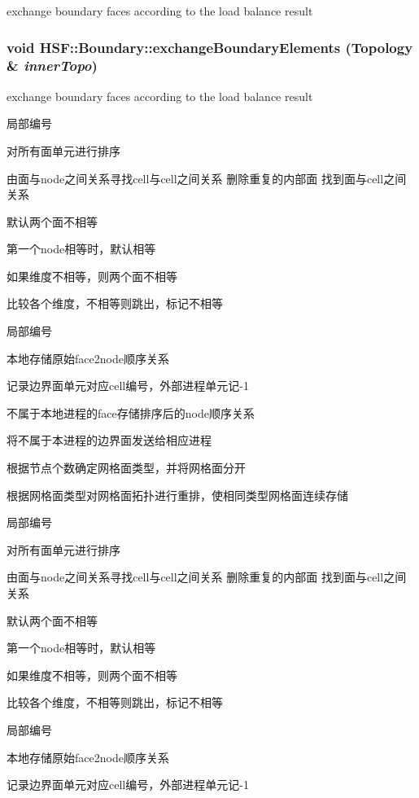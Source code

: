 exchange boundary faces according to the load balance result \hypertarget{classHSF_1_1Boundary_a247677270031ff60c915e7afb1a1de51}{
\subsubsection[{exchangeBoundaryElements}]{\setlength{\rightskip}{0pt plus 5cm}void HSF::Boundary::exchangeBoundaryElements ({\bf Topology} \& {\em innerTopo})}}
\label{classHSF_1_1Boundary_a247677270031ff60c915e7afb1a1de51}


exchange boundary faces according to the load balance result 

局部编号

对所有面单元进行排序

由面与node之间关系寻找cell与cell之间关系 删除重复的内部面 找到面与cell之间关系

默认两个面不相等

第一个node相等时，默认相等

如果维度不相等，则两个面不相等

比较各个维度，不相等则跳出，标记不相等

局部编号

本地存储原始face2node顺序关系

记录边界面单元对应cell编号，外部进程单元记-\/1

不属于本地进程的face存储排序后的node顺序关系

将不属于本进程的边界面发送给相应进程

根据节点个数确定网格面类型，并将网格面分开

根据网格面类型对网格面拓扑进行重排，使相同类型网格面连续存储

局部编号

对所有面单元进行排序

由面与node之间关系寻找cell与cell之间关系 删除重复的内部面 找到面与cell之间关系

默认两个面不相等

第一个node相等时，默认相等

如果维度不相等，则两个面不相等

比较各个维度，不相等则跳出，标记不相等

局部编号

本地存储原始face2node顺序关系

记录边界面单元对应cell编号，外部进程单元记-\/1

